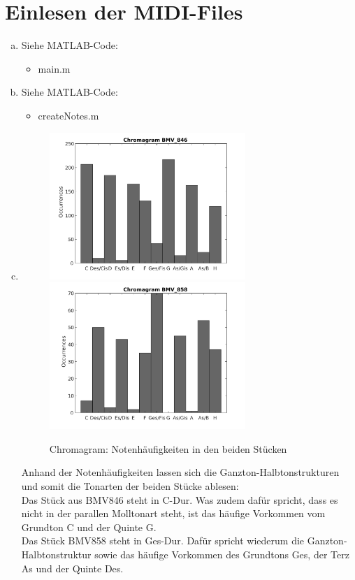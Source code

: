 \chapter{Einlesen der MIDI-Files}


\begin{enumerate}[a)]
\item
Siehe MATLAB-Code:
\begin{itemize}
\item
main.m
\end{itemize}

\item
Siehe MATLAB-Code:
\begin{itemize}
\item
createNotes.m
\end{itemize}
\item
\begin{figure}
  \centering
      \includegraphics[width=0.7\textwidth]{Figures/chromagram1}
      \includegraphics[width=0.7\textwidth]{Figures/chromagram2}
 \caption{Chromagram: Notenhäufigkeiten in den beiden Stücken}
	\label{fig:chr}
\end{figure}
Anhand der Notenhäufigkeiten lassen sich die Ganzton-Halbtonstrukturen und somit die Tonarten der beiden Stücke ablesen:\\
Das Stück aus BMV846 steht in C-Dur. Was zudem dafür spricht, dass es nicht in der parallen Molltonart steht, ist das häufige Vorkommen vom Grundton C und der Quinte G.\\
Das Stück BMV858 steht in Ges-Dur. Dafür spricht wiederum die Ganzton-Halbtonstruktur sowie das häufige Vorkommen des Grundtons Ges, der Terz As und der Quinte Des.
\end{enumerate}

